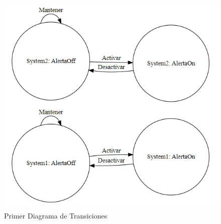 \begin{figure}
    \centering
    \includegraphics[width=1\linewidth]{Recursos/modelo1.png}
    \caption{Primer Diagrama de Transiciones}
    \label{fig:enter-label}
\end{figure}
